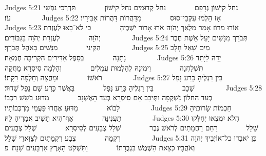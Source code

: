 Judges 5:21	נַחַל קִישׁוֹן גְּרָפָם        נַחַל קְדוּמִים נַחַל קִישׁוֹן        תִּדְרְכִי נַפְשִׁי עֹז׃        
Judges 5:22	אָז הָלְמוּ עִקְּבֵי־סוּס        מִדַּהֲרוֹת דַּהֲרוֹת אַבִּירָיו׃        
Judges 5:23	אוֹרוּ מֵרוֹז אָמַר מַלְאַךְ יְהֹוָה אֹרוּ אָרוֹר יֹשְׁבֶיהָ        כִּי לֹא־בָאוּ לְעֶזְרַת יְהֹוָה        לְעֶזְרַת יְהֹוָה בַּגִּבּוֹרִים׃        
Judges 5:24	תְּבֹרַךְ מִנָּשִׁים יָעֵל אֵשֶׁת חֶבֶר הַקֵּינִי        מִנָּשִׁים בָּאֹהֶל תְּבֹרָךְ׃        
Judges 5:25	מַיִם שָׁאַל חָלָב נָתָנָה        בְּסֵפֶל אַדִּירִים הִקְרִיבָה חֶמְאָה׃        
Judges 5:26	יָדָהּ לַיָּתֵד תִּשְׁלַחְנָה        וִימִינָהּ לְהַלְמוּת עֲמֵלִים        וְהָלְמָה סִיסְרָא מָחֲקָה רֹאשׁוֹ        וּמָחֲצָה וְחָלְפָה רַקָּתוֹ׃        
Judges 5:27	בֵּין רַגְלֶיהָ כָּרַע נָפַל שָׁכָב        בֵּין רַגְלֶיהָ כָּרַע נָפָל        בַּאֲשֶׁר כָּרַע שָׁם נָפַל שָׁדוּד׃        
Judges 5:28	בְּעַד הַחַלּוֹן נִשְׁקְפָה וַתְּיַבֵּב אֵם סִיסְרָא בְּעַד הָאֶשְׁנָב        מַדּוּעַ בֹּשֵׁשׁ רִכְבּוֹ לָבוֹא        מַדּוּעַ אֶחֱרוּ פַּעֲמֵי מַרְכְּבוֹתָיו׃        
Judges 5:29	חַכְמוֹת שָׂרוֹתֶיהָ תַּעֲנֶינָּה        אַף־הִיא תָּשִׁיב אֲמָרֶיהָ לָהּ׃        
Judges 5:30	הֲלֹא יִמְצְאוּ יְחַלְּקוּ שָׁלָל        רַחַם רַחֲמָתַיִם לְרֹאשׁ גֶּבֶר        שְׁלַל צְבָעִים לְסִיסְרָא        שְׁלַל צְבָעִים רִקְמָה        צֶבַע רִקְמָתַיִם לְצַוְּארֵי שָׁלָל׃        
Judges 5:31	כֵּן יֹאבְדוּ כל־אוֹיְבֶיךָ יְהֹוָה וְאֹהֲבָיו כְּצֵאת הַשֶּׁמֶשׁ בִּגְבֻרָתוֹ        וַתִּשְׁקֹט הָאָרֶץ אַרְבָּעִים שָׁנָה׃ {פ}
